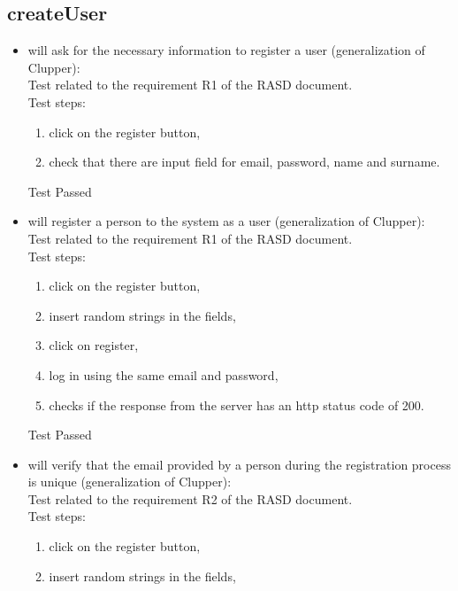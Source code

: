 \subsection{createUser}

\begin{itemize}
    \item will ask for the necessary information to register a user (generalization of Clupper): \\
    Test related to the requirement R1 of the RASD document. \\
    Test steps:
    \begin{enumerate}
        \item click on the register button,
        \item check that there are input field for email, password, name and surname.
    \end{enumerate}
    Test Passed \\

    \item will register a person to the system as a user (generalization of Clupper): \\
    Test related to the requirement R1 of the RASD document. \\
    Test steps:
    \begin{enumerate}
        \item click on the register button,
        \item insert random strings in the fields,
        \item click on register,
        \item log in using the same email and password,
        \item checks if the response from the server has an http status code of 200.
    \end{enumerate}
    Test Passed \\

    \item will verify that the email provided by a person during the registration process is unique (generalization of Clupper):\\
    Test related to the requirement R2 of the RASD document. \\
    Test steps:
    \begin{enumerate}

        \item click on the register button,

        \item insert random strings in the fields,


\end{enumerate}
\end{itemize}

